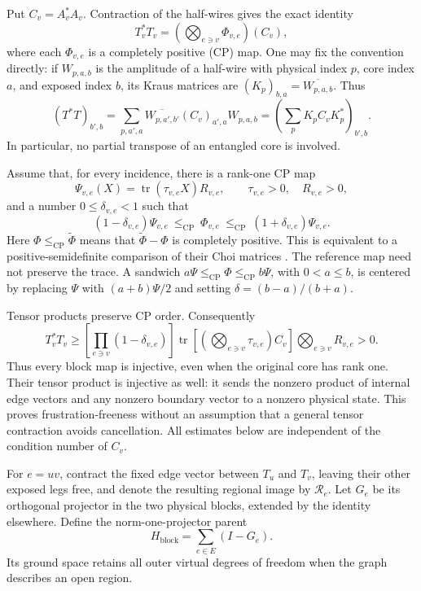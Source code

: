 Put $C_v=A_v^*A_v$.  Contraction of the half-wires gives the exact identity
\begin{equation}
 T_v^*T_v=\left(\bigotimes_{e\ni v}\Phi_{v,e}\right)(C_v),
 \label{q:gram-channel}
\end{equation}
where each $\Phi_{v,e}$ is a completely positive (CP) map.  One may fix
the convention directly: if $W_{p,a,b}$ is the amplitude of a half-wire
with physical index $p$, core index $a$, and exposed index $b$, its
Kraus matrices are $(K_p)_{b,a}=\overline{W_{p,a,b}}$.  Thus
\[
 (T^*T)_{b',b}
 =\sum_{p,a',a}\overline{W_{p,a',b'}}(C_v)_{a',a}W_{p,a,b}
 =\left(\sum_p K_pC_vK_p^*\right)_{b',b}.
\]
In particular, no partial transpose of an entangled core is involved.

Assume that, for every incidence, there is a rank-one CP map
\[
 \Psi_{v,e}(X)=\operatorname{tr}(\tau_{v,e}X)R_{v,e},
 \qquad \tau_{v,e}>0,\quad R_{v,e}>0,
\]
and a number $0\leq\delta_{v,e}<1$ such that
\begin{equation}
 (1-\delta_{v,e})\Psi_{v,e}
 \ \leq_{\mathrm{CP}}\ \Phi_{v,e}
 \ \leq_{\mathrm{CP}}\ (1+\delta_{v,e})\Psi_{v,e}.
 \label{q:cp-sandwich}
\end{equation}
Here $\Phi\leq_{\mathrm{CP}}\widetilde\Phi$ means that
$\widetilde\Phi-\Phi$ is completely positive.  This is equivalent to a
positive-semidefinite comparison of their Choi matrices
\cite{q:Choi1975}.  The reference
map need not preserve the trace.  A sandwich
$a\Psi\leq_{\mathrm{CP}}\Phi\leq_{\mathrm{CP}}b\Psi$, with $0<a\leq b$,
is centered by replacing $\Psi$ with $(a+b)\Psi/2$ and setting
$\delta=(b-a)/(b+a)$.

Tensor products preserve CP order.  Consequently
\begin{equation}
 T_v^*T_v\geq
 \left[\prod_{e\ni v}(1-\delta_{v,e})\right]
 \operatorname{tr}\!\left[
   \left(\bigotimes_{e\ni v}\tau_{v,e}\right)C_v\right]
 \bigotimes_{e\ni v}R_{v,e}>0.
 \label{q:injectivity}
\end{equation}
Thus every block map is injective, even when the original core has rank
one.  Their tensor product is injective as well: it sends the nonzero
product of internal edge vectors and any nonzero boundary vector to a
nonzero physical state.  This proves frustration-freeness without an
assumption that a general tensor contraction avoids cancellation.
All estimates below are independent of the condition number of $C_v$.

For $e=uv$, contract the fixed edge vector between $T_u$ and $T_v$,
leaving their other exposed legs free, and denote the resulting regional
image by $\mathcal R_e$.  Let $G_e$ be its orthogonal projector in the
two physical blocks, extended by the identity elsewhere.  Define the
norm-one-projector parent
\begin{equation}
 H_{\mathrm{block}}=\sum_{e\in E}(I-G_e).
 \label{q:block-parent}
\end{equation}
Its ground space retains all outer virtual degrees of freedom when the
graph describes an open region.

